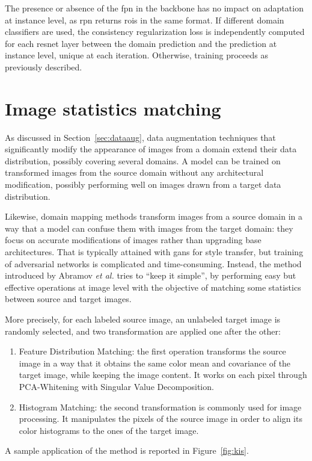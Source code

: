 \documentclass[%
    corpo=12pt,
    twoside,
    stile=classica,   
    tipotesi=magistrale,
    evenboxes,
    english,
	numerazioneromana,
]{toptesi}
\newcommand{\quotes}[1]{``#1''}
\begin{document}
The presence or absence of the \gls{fpn} in the backbone has no impact on adaptation at instance level, as \gls{rpn} returns \glspl{roi} in the same format. If different domain classifiers are used, the consistency regularization loss is independently computed for each \gls{resnet} layer between the domain prediction and the prediction at instance level, unique at each iteration. Otherwise, training proceeds as previously described.

\section{Image statistics matching}
As discussed in Section~\ref{sec:dataaug}, data augmentation techniques that significantly modify the appearance of images from a domain extend their data distribution, possibly covering several domains. A model can be trained on transformed images from the source domain without any architectural modification, possibly performing well on images drawn from a target data distribution.

\bigskip
Likewise, domain mapping methods transform images from a source domain in a way that a model can confuse them with images from the target domain: they focus on accurate modifications of images rather than upgrading base architectures. That is typically attained with \glspl{gan} for style transfer, but training of adversarial networks is complicated and time-consuming. Instead, the method introduced by Abramov \textit{et al.}\cite{abramov2020simple} tries to \quotes{keep it simple}, by performing easy but effective operations at image level with the objective of matching some statistics between source and target images.

More precisely, for each labeled source image, an unlabeled target image is randomly selected, and two transformation are applied one after the other:
\begin{enumerate}
	\item Feature Distribution Matching: the first operation transforms the source image in a way that it obtains the same color mean and covariance of the target image, while keeping the image content. It works on each pixel through PCA-Whitening with Singular Value Decomposition.
	\item Histogram Matching: the second transformation is commonly used for image processing. It manipulates the pixels of the source image in order to align its color histograms to the ones of the target image.
\end{enumerate}
A sample application of the method is reported in Figure~\ref{fig:kis}.
\end{document}
